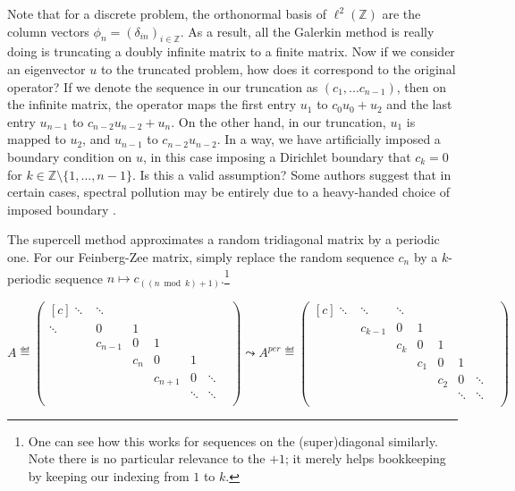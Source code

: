 \documentclass[../main.tex]{subfiles}
\begin{document}
Note that for a discrete problem, the orthonormal basis of $\ell^2(\mathbb{Z})$ are the column vectors $\phi_n = (\delta_{in})_{i \in \mathbb{Z}}$. As a result, all the Galerkin method is really doing is truncating a doubly infinite matrix to a finite matrix. Now if we consider an eigenvector $u$ to the truncated problem, how does it correspond to the original operator? If we denote the sequence in our truncation as $(c_1, ... c_{n-1})$, then on the infinite matrix, the operator maps the first entry $u_1$ to $c_0 u_0 + u_2$ and the last entry $u_{n-1}$ to $c_{n-2} u_{n-2} + u_{n}$. On the other hand, in our truncation, $u_1$ is mapped to $u_2$, and $u_{n-1}$ to $c_{n-2} u_{n-2}$. In a way, we have artificially imposed a boundary condition on $u$, in this case imposing a Dirichlet boundary that $c_k = 0$ for $k \in \mathbb{Z} \setminus \{1, \hdots, n-1\}$. Is this a valid assumption? Some authors suggest that in certain cases, spectral pollution may be entirely due to a heavy-handed choice of imposed boundary \cite{cances2011periodic}.

The supercell method approximates a random tridiagonal matrix by a periodic one. For our Feinberg-Zee matrix, simply replace the random sequence $c_n$ by a $k$-periodic sequence $n \mapsto c_{((n \bmod k )+ 1)}$.\footnote{One can see how this works for sequences on the (super)diagonal similarly. Note there is no particular relevance to the $+1$; it merely helps bookkeeping by keeping our indexing from $1$ to $k$.}

$$ 
A \eqdef \begin{pmatrix*}[c]
\ddots & \ddots & & & & \\
\ddots & 0 & 1 & & & \\
& c_{n-1} & 0 & 1 & & \\
& & c_{n} & 0 & 1 & \\
& & & c_{n+1} & 0 & \ddots \\
& & & & \ddots & \ddots & \\
\end{pmatrix*}
\leadsto A^{per} \eqdef
\begin{pmatrix*}[c]
\ddots & \ddots & \ddots & & & &\\
& c_{k-1} & 0 & 1 & & & &\\
& & c_{k} & 0 & 1 & & &\\
& & & c_1 & 0 & 1 & \\
& &&  & c_2 & 0 & \ddots \\
& & & & & \ddots & \ddots & \\
\end{pmatrix*}
$$
\end{document}
